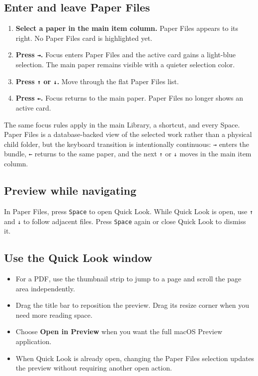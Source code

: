 \documentclass[10pt,letterpaper,oneside]{scrreprt}
\providecommand{\tightlist}{\setlength{\itemsep}{1pt}\setlength{\parskip}{0pt}}
\begin{document}
\subsection{Enter and leave Paper Files}\label{enter-and-leave-paper-files}

\begin{enumerate}
\tightlist
\item
  \textbf{Select a paper in the main item column.} Paper Files appears to its right. No Paper Files card is highlighted yet.
\item
  \textbf{Press \texttt{{\symbolfont →}}.} Focus enters Paper Files and the active card gains a light-blue selection. The main paper remains visible with a quieter selection color.
\item
  \textbf{Press \texttt{{\symbolfont ↑}} or \texttt{{\symbolfont ↓}}.} Move through the flat Paper Files list.
\item
  \textbf{Press \texttt{{\symbolfont ←}}.} Focus returns to the main paper. Paper Files no longer shows an active card.
\end{enumerate}

The same focus rules apply in the main Library, a shortcut, and every Space. Paper Files is a database-backed view of the selected work rather than a physical child folder, but the keyboard transition is intentionally continuous: \texttt{{\symbolfont →}} enters the bundle, \texttt{{\symbolfont ←}} returns to the same paper, and the next \texttt{{\symbolfont ↑}} or \texttt{{\symbolfont ↓}} moves in the main item column.

\subsection{Preview while navigating}\label{preview-while-navigating}

In Paper Files, press \texttt{Space} to open Quick Look. While Quick Look is open, use \texttt{{\symbolfont ↑}} and \texttt{{\symbolfont ↓}} to follow adjacent files. Press \texttt{Space} again or close Quick Look to dismiss it.

\subsection{Use the Quick Look window}\label{use-the-quick-look-window}

\begin{itemize}
\tightlist
\item
  For a PDF, use the thumbnail strip to jump to a page and scroll the page area independently.
\item
  Drag the title bar to reposition the preview. Drag its resize corner when you need more reading space.
\item
  Choose \textbf{Open in Preview} when you want the full macOS Preview application.
\item
  When Quick Look is already open, changing the Paper Files selection updates the preview without requiring another open action.
\end{itemize}
\end{document}
